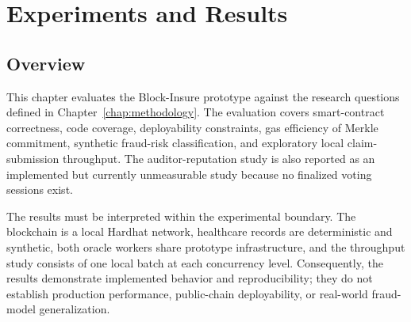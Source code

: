\chapter{Experiments and Results}
\label{chap:experiments_results}

\section{Overview}
\label{sec:results_overview}

This chapter evaluates the Block-Insure prototype against the research questions
defined in Chapter~\ref{chap:methodology}. The evaluation covers smart-contract
correctness, code coverage, deployability constraints, gas efficiency of Merkle
commitment, synthetic fraud-risk classification, and exploratory local
claim-submission throughput. The auditor-reputation study is also reported as an
implemented but currently unmeasurable study because no finalized voting
sessions exist.

The results must be interpreted within the experimental boundary. The
blockchain is a local Hardhat network, healthcare records are deterministic and
synthetic, both oracle workers share prototype infrastructure, and the
throughput study consists of one local batch at each concurrency level.
Consequently, the results demonstrate implemented behavior and reproducibility;
they do not establish production performance, public-chain deployability, or
real-world fraud-model generalization.

\begin{table}[htbp]
\centering
\caption{Summary of research questions and principal findings}
\label{tab:rq_findings}
\end{table}

